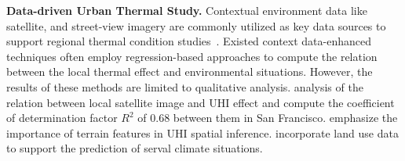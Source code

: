 \noindent
\textbf{Data-driven Urban Thermal Study.} Contextual environment data like satellite, and street-view imagery are commonly utilized as key data sources to support regional thermal condition studies~\cite{hao2025unlocking,han2024microclimate,hao2025nature}. Existed context data-enhanced techniques often employ regression-based approaches to compute the relation between the local thermal effect and environmental situations. However, the results of these methods are limited to qualitative analysis. \cite{equere2020definition} analysis of the relation between local satellite image and UHI effect and compute the coefficient of determination factor $R^{2}$ of 0.68 between them in San Francisco. \cite{equere2021integration} emphasize the importance of terrain features in UHI spatial inference. \cite{han2024microclimate} incorporate land use data to support the prediction of serval climate situations.
